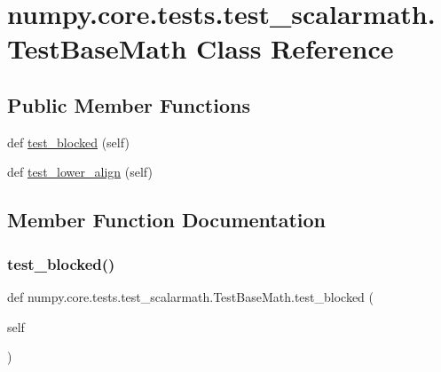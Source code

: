 \hypertarget{classnumpy_1_1core_1_1tests_1_1test__scalarmath_1_1TestBaseMath}{}\section{numpy.\+core.\+tests.\+test\+\_\+scalarmath.\+Test\+Base\+Math Class Reference}
\label{classnumpy_1_1core_1_1tests_1_1test__scalarmath_1_1TestBaseMath}
\subsection*{Public Member Functions}
\begin{DoxyCompactItemize}
\item 
def \hyperlink{classnumpy_1_1core_1_1tests_1_1test__scalarmath_1_1TestBaseMath_a16c89195386800b8e117130087be3ab3}{test\+\_\+blocked} (self)
\item 
def \hyperlink{classnumpy_1_1core_1_1tests_1_1test__scalarmath_1_1TestBaseMath_a40bb8860478d5af30fdf956168190d9f}{test\+\_\+lower\+\_\+align} (self)
\end{DoxyCompactItemize}


\subsection{Member Function Documentation}
\mbox{\label{classnumpy_1_1core_1_1tests_1_1test__scalarmath_1_1TestBaseMath_a16c89195386800b8e117130087be3ab3}} 
\subsubsection{\texorpdfstring{test\+\_\+blocked()}{test\_blocked()}}
{\footnotesize\ttfamily def numpy.\+core.\+tests.\+test\+\_\+scalarmath.\+Test\+Base\+Math.\+test\+\_\+blocked (\begin{DoxyParamCaption}\item[{}]{self }\end{DoxyParamCaption})}

